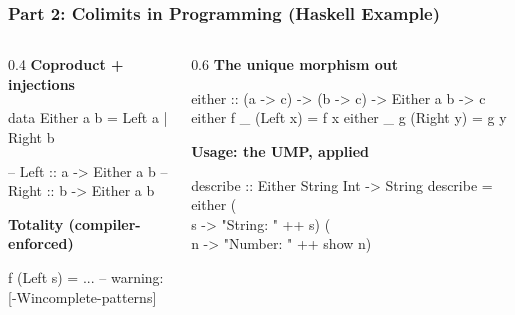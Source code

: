 \documentclass[11pt,t,usepdftitle=false,aspectratio=169]{beamer}
\begin{document}
\begin{frame}[fragile]
\frametitle{Part 2: Colimits in Programming (Haskell Example)}

  \begin{columns}[T]
    \begin{column}{0.4\textwidth}
      {\color{uibkorange}\textbf{Coproduct + injections}}

      \begin{semiverbatim}\small
data Either a b
  = Left  a
  | Right b

-- Left  :: a -> Either a b
-- Right :: b -> Either a b
      \end{semiverbatim}

      \vspace{0.5em}
      {\color{uibkorange}\textbf{Totality (compiler-enforced)}}

      \begin{semiverbatim}\small
f (Left s) = ...
-- warning: [-Wincomplete-patterns]
      \end{semiverbatim}
    \end{column}

    \begin{column}{0.6\textwidth}
      {\color{uibkorange}\textbf{The unique morphism out}}

      \begin{semiverbatim}\small
either :: (a -> c) -> (b -> c)
       -> Either a b -> c
either f _ (Left  x) = f x
either _ g (Right y) = g y
      \end{semiverbatim}

      \vspace{0.5em}
      {\color{uibkorange}\textbf{Usage: the UMP, applied}}

      \begin{semiverbatim}\small
describe :: Either String Int -> String
describe = either
  (\\s -> "String: " ++ s)
  (\\n -> "Number: " ++ show n)
      \end{semiverbatim}
    \end{column}
  \end{columns}

\end{frame}
\end{document}
